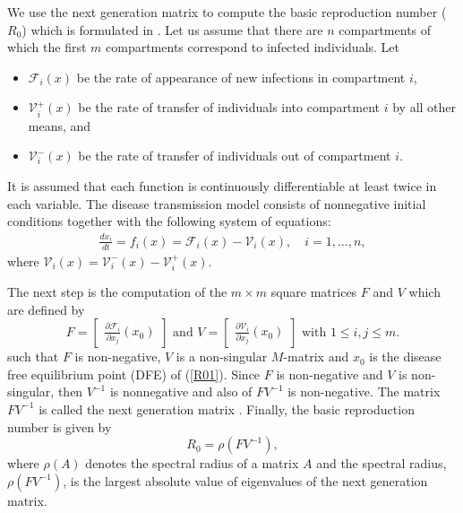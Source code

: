 \documentclass[review]{elsarticle}
\begin{document}
\medskip

We use the next generation matrix to compute the basic reproduction number ($R_0$) which is formulated in \cite{Watmough}. Let us assume that there are $n$ compartments of which the first $m$ compartments correspond to infected individuals. Let
\begin{itemize}
\item $\mathscr{F}_i(x)$ be the rate of appearance of new infections in compartment $i$,
\item $\mathscr{V}_i^+(x)$ be the rate of transfer of individuals into compartment $i$ by all other means, and
\item $\mathscr{V}_i^-(x)$ be the rate of transfer of individuals out of compartment $i$.
\end{itemize}
It is assumed that each function is continuously differentiable at least twice in each variable. The disease transmission model consists of nonnegative initial conditions together with the following system of equations:
\begin{align}\label{R01}
\frac{dx_i}{dt}=f_i(x)=\mathscr{F}_i(x)-\mathscr{V}_i(x),\quad i=1,\ldots,n,
\end{align}
where $\mathscr{V}_i(x)=\mathscr{V}_i^-(x)-\mathscr{V}_i^+(x)$.


\medskip

The next step is the computation of the $m\times m$ square matrices $F$ and $V$ which are defined by
\[F=
\begin{bmatrix}
\frac{\partial\mathscr{F}_i }{\partial x_j}(x_0)
\end{bmatrix}
\mbox{ and }
V=
\begin{bmatrix}
\frac{\partial\mathscr{V}_i }{\partial x_j}(x_0)
\end{bmatrix}
\mbox{ with } 1\leq i,j\leq m.
\]
such that $F$ is non-negative, $V$ is a non-singular $M$-matrix and $x_0$ is the disease free equilibrium point (DFE) of (\ref{R01}). Since $F$ is non-negative and $V$ is non-singular, then $V^{-1}$ is nonnegative and also of $FV^{-1}$ is non-negative. The matrix $FV^{-1}$ is called the next generation matrix \cite{Watmough}. Finally, the basic reproduction number is given by
\[
R_0=\rho(FV^{-1}),
\]
where $\rho(A)$ denotes the spectral radius of a matrix $A$ and the spectral radius, $\rho(FV^{-1})$, is the largest absolute value of eigenvalues of the next generation matrix.
\end{document}
